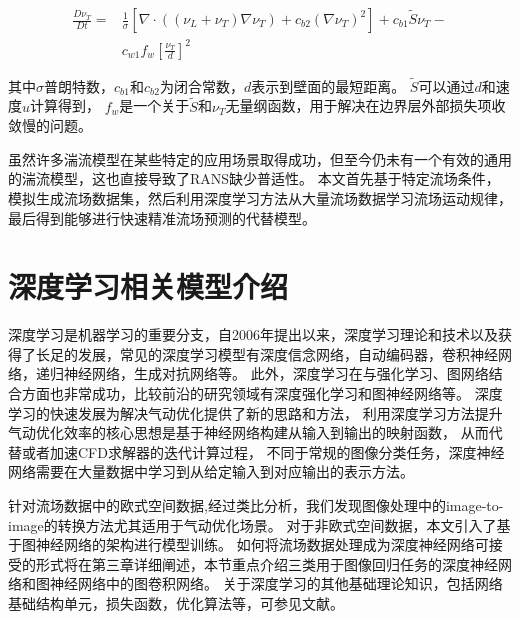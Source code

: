 \begin{equation}\label{SA_equo}
\begin{split}
\frac{D \nu_{T}}{D t}=& \frac{1}{\sigma}\left[\nabla \cdot((\nu_{L}+\nu_{T}) \nabla \nu_{T})+c_{b 2}(\nabla \nu_{T})^{2}\right] +c_{b 1} \tilde{S} \nu_{T} - \\ &c_{w 1} f_{w}\left[\frac{\nu_{T}}{d}\right]^{2}
\end{split}
\end{equation}

\noindent 其中$\sigma$普朗特数，$c_{b 1}$和$c_{b 2}$为闭合常数，$d$表示到壁面的最短距离。
$\tilde{S}$可以通过$d$和速度$u$计算得到，
$f_{w}$是一个关于$\tilde{S}$和$\nu_{T}$无量纲函数，用于解决在边界层外部损失项收敛慢的问题。

虽然许多湍流模型在某些特定的应用场景取得成功，但至今仍未有一个有效的通用的湍流模型，这也直接导致了RANS缺少普适性。
本文首先基于特定流场条件，模拟生成流场数据集，然后利用深度学习方法从大量流场数据学习流场运动规律，
最后得到能够进行快速精准流场预测的代替模型。


\section{深度学习相关模型介绍}
深度学习是机器学习的重要分支，自2006年提出以来，深度学习理论和技术以及获得了长足的发展，常见的深度学习模型有深度信念网络\cite{深度信念网络}，自动编码器\cite{Bengio2013Representation}，卷积神经网络\cite{Lecun1998Gradient}，递归神经网络\cite{Williams2014A}，生成对抗网络\cite{GAN}等。
此外，深度学习在与强化学习、图网络结合方面也非常成功，比较前沿的研究领域有深度强化学习\cite{Deepreinforcementlearning}和图神经网络\cite{2016Semi}等。
深度学习的快速发展为解决气动优化提供了新的思路和方法，
利用深度学习方法提升气动优化效率的核心思想是基于神经网络构建从输入到输出的映射函数，
从而代替或者加速CFD求解器的迭代计算过程，
不同于常规的图像分类任务，深度神经网络需要在大量数据中学习到从给定输入到对应输出的表示方法。

针对流场数据中的欧式空间数据,经过类比分析，我们发现图像处理中的image-to-image\cite{DBLP:conf/miccai/RonnebergerFB15,DBLP:conf/cvpr/LongSD15,isola2017image,CycleGAN2017,DBLP:conf/cvpr/AmodioK19}的转换方法尤其适用于气动优化场景。
对于非欧式空间数据，本文引入了基于图神经网络的架构进行模型训练。
如何将流场数据处理成为深度神经网络可接受的形式将在第三章详细阐述，本节重点介绍三类用于图像回归任务的深度神经网络和图神经网络中的图卷积网络。
关于深度学习的其他基础理论知识，包括网络基础结构单元，损失函数，优化算法等，可参见文献\cite{dnnsurvey}。

